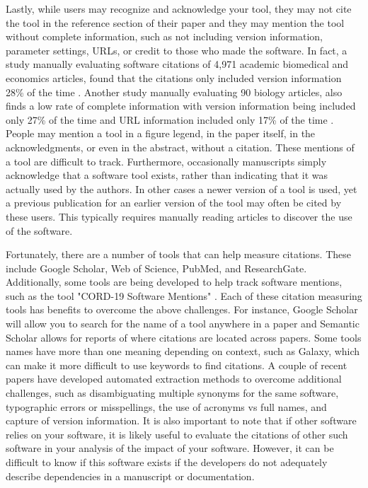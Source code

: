 \documentclass{article}
\begin{document}
Lastly, while users may recognize and acknowledge your tool, they may not cite the tool in the reference section of their paper and they may mention the tool without complete information, such as not including version information, parameter settings, URLs, or credit to those who made the software.  In fact, a study manually evaluating software citations of 4,971 academic biomedical and economics articles, found that the citations only included version information  28\% of the time \cite{howison_software_2016}.  Another study manually evaluating 90 biology articles, also finds a low rate of complete information with version information being included only 27\% of the time and URL information included only 17\% of the time \cite{du_softcite_2021}. People may mention a tool in a figure legend, in the paper itself, in the acknowledgments, or even in the abstract, without a citation. These mentions of a tool are difficult to track. Furthermore, occasionally manuscripts simply acknowledge that a software tool exists, rather than indicating that it was actually used by the authors. In other cases a newer version of a tool is used, yet a previous publication for an earlier version of the tool may often be cited by these users. This typically requires manually reading articles to discover the use of the software. 

Fortunately, there are a number of tools that can help measure citations. These include Google Scholar, Web of Science, PubMed, and ResearchGate. Additionally, some tools are being developed to help track software mentions, such as the tool "CORD-19 Software Mentions" \cite{wade_cord-19_2021}. Each of these citation measuring tools has benefits to overcome the above challenges. For instance, Google Scholar will allow you to search for the name of a tool anywhere in a paper and Semantic Scholar allows for reports of where citations are located across papers. Some tools names have more than one meaning depending on context, such as Galaxy, which can make it more difficult to use keywords to find citations. A couple of recent papers \cite{istrate_large_2022, schindler_role_2022} have developed automated extraction methods to overcome additional challenges, such as disambiguating multiple synonyms for the same software, typographic errors or misspellings, the use of acronyms vs full names, and capture of version information. It is also important to note that if other software relies on your software, it is likely useful to evaluate the citations of other such software in your analysis of the impact of your software. However, it can be difficult to know if this software exists if the developers do not adequately describe dependencies in a manuscript or documentation.
\end{document}
